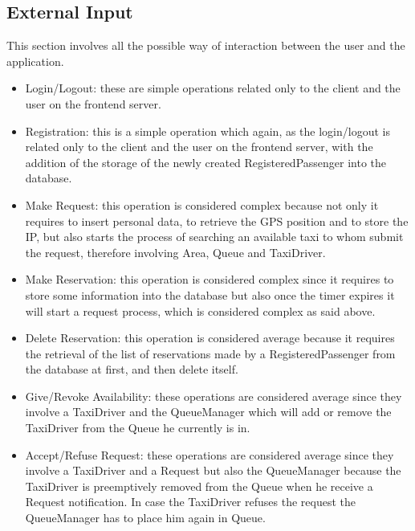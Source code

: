 \subsection{External Input}
This section involves all the possible way of interaction between the user and
the application.
\begin{itemize}
  \item Login/Logout: these are simple operations related only to the client and
  the user on the frontend server.
  \item Registration: this is a simple operation which again, as the login/logout is
  related only to the client and the user on the frontend server, with the addition of the
  storage of the newly created RegisteredPassenger into the database.
  \item Make Request: this operation is considered complex because not only it requires
  to insert personal data, to retrieve the GPS position and to store the IP, but also starts
  the process of searching an available taxi to whom submit the request, therefore involving Area,
  Queue and TaxiDriver.
  \item Make Reservation: this operation is considered complex since it requires to store some information
  into the database but also once the timer expires it will start a request process, which is considered
  complex as said above.
  \item Delete Reservation: this operation is considered average because it requires the retrieval of
  the list of reservations made by a RegisteredPassenger from the database at first, and then delete itself.
  \item Give/Revoke Availability: these operations are considered average since they involve a TaxiDriver and the
  QueueManager which will add or remove the TaxiDriver from the Queue he currently is in.
  \item Accept/Refuse Request: these operations are considered average since they involve a TaxiDriver and a Request
  but also the QueueManager because the TaxiDriver is preemptively removed from the Queue when he receive a Request notification.
  In case the TaxiDriver refuses the request the QueueManager has to place him again in Queue.
\end{itemize}
